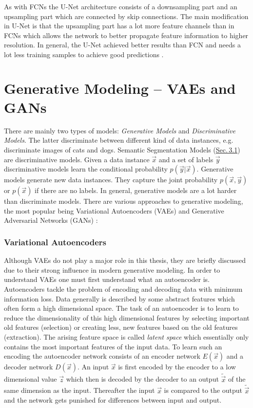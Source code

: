 As with FCNs the U-Net architecture consists of a downsampling part and an upsampling part which are connected by skip connections. The main modification in U-Net is that the upsampling part has a lot more feature channels than in FCNs which allows the network to better propagate feature information to higher resolution. In general, the U-Net achieved better results than FCN and needs a lot less training samples to achieve good predictions \cite{unet}.

\section[Generative Modeling – VAEs and GANs]{Generative Modeling – VAEs and GANs%
    }
There are mainly two types of models: \textit{Generative Models} and \textit{Discriminative Models}. The latter discriminate between different kind of data instances, e.g. discriminate images of cats and dogs. Semantic Segmentation Models (\hyperref[sec:3.1]{Sec.\,3.1}) are discriminative models. Given a data instance $\vec{x}$ and a set of labels $\vec{y}$ discriminative models learn the conditional probability $p(\vec{y}|\vec{x})$. Generative models generate new data instances. They capture the joint probability $p(\vec{x},\vec{y})$ or $p(\vec{x})$ if there are no labels. In general, generative models are a lot harder than discriminate models. There are various approaches to generative modeling, the most popular being Variational Autoencoders (VAEs) \cite{vae_original} and Generative Adversarial Networks (GANs) \cite{gan_original}:

\subsubsection{Variational Autoencoders}
Although VAEs \cite{vae_original} do not play a major role in this thesis, they are briefly discussed due to their strong influence in modern generative modeling. In order to understand VAEs one must first understand what an autoencoder is. Autoencoders tackle the problem of encoding and decoding data with minimum information loss. Data generally is described by some abstract features which often form a high dimensional space. The task of an autoencoder is to learn to reduce the dimensionality of this high dimensional features by selecting important old features (selection) or creating less, new features based on the old features (extraction). The arising feature space is called \textit{latent space} which essentially only contains the most important features of the input data. To learn such an encoding the autoencoder network consists of an encoder network $E(\vec{x})$ and a decoder network $D(\vec{x})$. An input $\vec{x}$ is first encoded by the encoder to a low dimensional value $\vec{z}$ which then is decoded by the decoder to an output $\tilde{\vec{x}}$ of the same dimension as the input. Thereafter the input $\vec{x}$ is compared to the output $\tilde{\vec{x}}$ and the network gets punished for differences between input and output.

